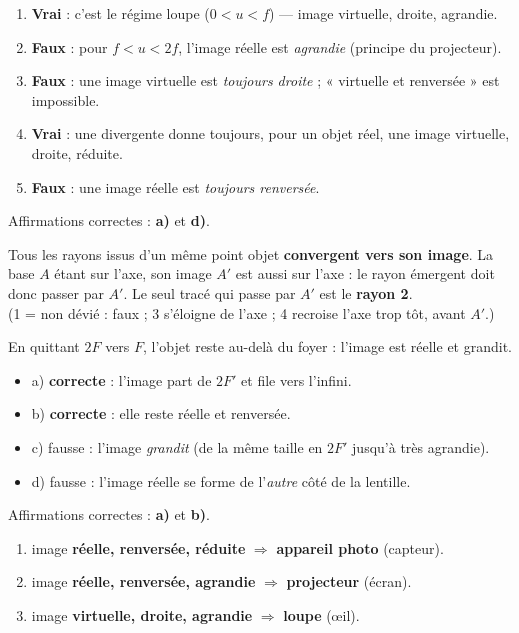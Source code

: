 \documentclass[11pt,a4paper]{article}
\begin{document}

\begin{corrige}
\begin{enumerate}[label=\alph*)]
  \item \textbf{Vrai} : c'est le régime loupe ($0<u<f$) --- image virtuelle, droite, agrandie.
  \item \textbf{Faux} : pour $f<u<2f$, l'image réelle est \emph{agrandie} (principe du projecteur).
  \item \textbf{Faux} : une image virtuelle est \emph{toujours droite} ; « virtuelle et renversée » est
        impossible.
  \item \textbf{Vrai} : une divergente donne toujours, pour un objet réel, une image virtuelle,
        droite, réduite.
  \item \textbf{Faux} : une image réelle est \emph{toujours renversée}.
\end{enumerate}
Affirmations correctes : \textbf{a)} et \textbf{d)}.
\end{corrige}

\begin{corrige}
Tous les rayons issus d'un même point objet \textbf{convergent vers son image}. La base $A$ étant sur
l'axe, son image $A'$ est aussi sur l'axe : le rayon émergent doit donc passer par $A'$.
Le seul tracé qui passe par $A'$ est le \textbf{rayon 2}.\\
(1 = non dévié : faux ; 3 s'éloigne de l'axe ; 4 recroise l'axe trop tôt, avant $A'$.)
\end{corrige}

\begin{corrige}
En quittant $2F$ vers $F$, l'objet reste au-delà du foyer : l'image est réelle et grandit.
\begin{itemize}[label=--,leftmargin=1.4em,topsep=2pt,itemsep=1pt]
  \item a) \textbf{correcte} : l'image part de $2F'$ et file vers l'infini.
  \item b) \textbf{correcte} : elle reste réelle et renversée.
  \item c) fausse : l'image \emph{grandit} (de la même taille en $2F'$ jusqu'à très agrandie).
  \item d) fausse : l'image réelle se forme de l'\emph{autre} côté de la lentille.
\end{itemize}
Affirmations correctes : \textbf{a)} et \textbf{b)}.
\end{corrige}

\begin{corrige}
\begin{enumerate}[label=\alph*)]
  \item image \textbf{réelle, renversée, réduite} $\Rightarrow$ \textbf{appareil photo} (capteur).
  \item image \textbf{réelle, renversée, agrandie} $\Rightarrow$ \textbf{projecteur} (écran).
  \item image \textbf{virtuelle, droite, agrandie} $\Rightarrow$ \textbf{loupe} (\oe il).
\end{enumerate}
\end{corrige}
\end{document}

